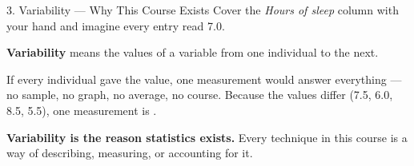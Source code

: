 \documentclass[10pt]{article}
\begin{document}
\boxguard[16]
\begin{notesbox}{3. Variability --- Why This Course Exists}
\small
Cover the \emph{Hours of sleep} column with your hand and imagine every entry read 7.0.

\vspace{6pt}
\textbf{Variability} means the values of a variable \blank{2.6cm} from one individual to the
next.

\vspace{6pt}
If every individual gave the \blank{2.4cm} value, one measurement would answer everything ---
no sample, no graph, no average, no course. Because the values differ (7.5, 6.0, 8.5, 5.5), one
measurement is \blank{2.6cm}.

\vspace{4pt}
\textbf{Variability is the reason statistics exists.} Every technique in this course is a way
of describing, measuring, or accounting for it.
\end{notesbox}

\vspace{0.10in}
\end{document}

